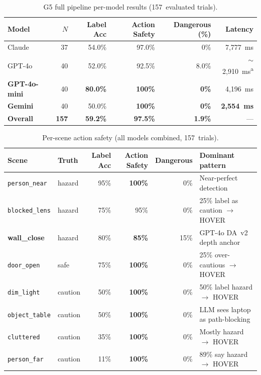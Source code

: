 \begin{table}[ht]
  \caption{G5 full pipeline per-model results (157~evaluated trials).}
  \label{tab:ch2_g5_models}
  \centering
  \small
  \begin{tabular}{lrrrrr}
    \toprule
    Model & $N$ & Label Acc & Action Safety & Dangerous (\%) & Latency \\
    \midrule
    Claude           & 37 & 54.0\% & 97.0\%         & 0\%   & 7,777~ms \\
    GPT-4o           & 40 & 52.0\% & 92.5\%         & 8.0\% & $\sim$2,910~ms\textsuperscript{a} \\
    \textbf{GPT-4o-mini} & 40 & \textbf{80.0\%} & \textbf{100\%} & \textbf{0\%} & 4,196~ms \\
    \textbf{Gemini}  & 40 & 50.0\% & \textbf{100\%} & \textbf{0\%} & \textbf{2,554~ms} \\
    \midrule
    \textbf{Overall} & \textbf{157} & \textbf{59.2\%} & \textbf{97.5\%} & \textbf{1.9\%} & --- \\
    \bottomrule
  \end{tabular}
\end{table}

\begin{table}[ht]
  \caption{Per-scene action safety (all models combined, 157~trials).}
  \label{tab:ch2_g5_scenes}
  \centering
  \small
  \begin{tabular}{llrrrl}
    \toprule
    Scene & Truth & Label Acc & Action Safety & Dangerous & Dominant pattern \\
    \midrule
    \texttt{person\_near}  & hazard  & 95\% & \textbf{100\%} & 0\% & Near-perfect detection \\
    \texttt{blocked\_lens} & hazard  & 75\% & 95\%           & 0\% & 25\% label as caution $\to$ HOVER \\
    \textbf{wall\_close}   & hazard  & 80\% & \textbf{85\%}  & 15\% & GPT-4o DA~v2 depth anchor \\
    \texttt{door\_open}    & safe    & 75\% & \textbf{100\%} & 0\% & 25\% over-cautious $\to$ HOVER \\
    \texttt{dim\_light}    & caution & 50\% & \textbf{100\%} & 0\% & 50\% label hazard $\to$ HOVER \\
    \texttt{object\_table} & caution & 50\% & \textbf{100\%} & 0\% & LLM sees laptop as path-blocking \\
    \texttt{cluttered}     & caution & 35\% & \textbf{100\%} & 0\% & Mostly hazard $\to$ HOVER \\
    \texttt{person\_far}   & caution & 11\% & \textbf{100\%} & 0\% & 89\% say hazard $\to$ HOVER \\
    \bottomrule
  \end{tabular}
\end{table}

